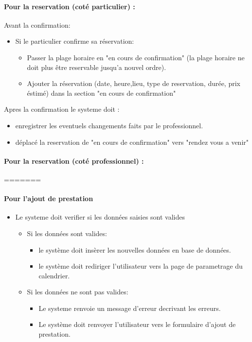 \documentclass{article}
\begin{document}
\begin{itemize}
\begin{itemize}
\begin{itemize}
\paragraph{Pour la reservation (coté particulier) :}
Avant la confirmation:
	\begin{itemize}
	\item Si le particulier confirme sa réservation:
		\begin{itemize}
		\item Passer la plage horaire en "en cours de confirmation"
			(la plage horaire ne doit plus être reservable jusqu'a nouvel ordre).
		\item Ajouter la réservation (date, heure,lieu, type de reservation, durée, prix éstimé) dans la section "en cours de confirmation"
		\end{itemize}
	\end{itemize}
Apres la confirmation le systeme doit :
		\begin{itemize}
		\item enregistrer les eventuels changements faits par le professionnel.
		\item déplacé la reservation de "en cours de confirmation" vers "rendez vous a venir"
		\end{itemize}


\paragraph{Pour la reservation (coté professionnel) :}
=======
\end{itemize}


\paragraph{Pour l'ajout de prestation}
\begin{itemize}
\item Le systeme doit verifier si les données saisies sont valides
	\begin{itemize}
	\item Si les données sont valides:
		\begin{itemize}
		\item le système doit insèrer les nouvelles données en base
                  de données.
                  \item le système doit rediriger l'utilisateur vers
                    la page de parametrage du calendrier.
		\end{itemize}
		\item Si les données ne sont pas valides:
		\begin{itemize}
		\item Le systeme renvoie un message d'erreur decrivant
                  les erreurs.
                \item Le système doit renvoyer l'utilisateur vers le
                  formulaire d'ajout de prestation.
		\end{itemize}
	\end{itemize}
\end{itemize}



\end{itemize}
\end{itemize}
\end{document}
